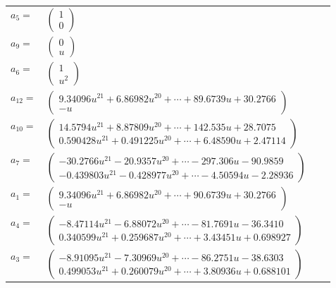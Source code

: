 \documentclass[1p]{elsarticle_modified}
\theoremstyle{definition}
\begin{document}
\begin{tabular}{m{7pt} m{180pt} m{7pt} m{180pt} }
\flushright $a_{5}=$&$\begin{pmatrix}1\\0\end{pmatrix}$ \\
\flushright $a_{9}=$&$\begin{pmatrix}0\\u\end{pmatrix}$ \\
\flushright $a_{6}=$&$\begin{pmatrix}1\\u^2\end{pmatrix}$ \\
\flushright $a_{12}=$&$\begin{pmatrix}9.34096 u^{21}+6.86982 u^{20}+\cdots+89.6739 u+30.2766\\- u\end{pmatrix}$ \\
\flushright $a_{10}=$&$\begin{pmatrix}14.5794 u^{21}+8.87809 u^{20}+\cdots+142.535 u+28.7075\\0.590428 u^{21}+0.491225 u^{20}+\cdots+6.48590 u+2.47114\end{pmatrix}$ \\
\flushright $a_{7}=$&$\begin{pmatrix}-30.2766 u^{21}-20.9357 u^{20}+\cdots-297.306 u-90.9859\\-0.439803 u^{21}-0.428977 u^{20}+\cdots-4.50594 u-2.28936\end{pmatrix}$ \\
\flushright $a_{1}=$&$\begin{pmatrix}9.34096 u^{21}+6.86982 u^{20}+\cdots+90.6739 u+30.2766\\- u\end{pmatrix}$ \\
\flushright $a_{4}=$&$\begin{pmatrix}-8.47114 u^{21}-6.88072 u^{20}+\cdots-81.7691 u-36.3410\\0.340599 u^{21}+0.259687 u^{20}+\cdots+3.43451 u+0.698927\end{pmatrix}$ \\
\flushright $a_{3}=$&$\begin{pmatrix}-8.91095 u^{21}-7.30969 u^{20}+\cdots-86.2751 u-38.6303\\0.499053 u^{21}+0.260079 u^{20}+\cdots+3.80936 u+0.688101\end{pmatrix}$ \\

\end{tabular}
\end{document}
